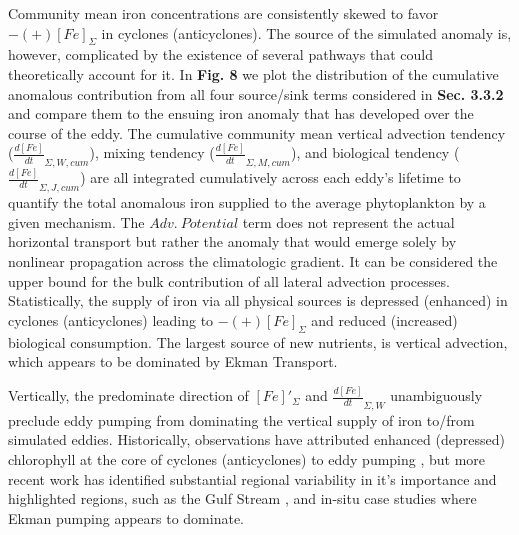 Community mean iron concentrations are consistently skewed to favor $-(+)[Fe]_\Sigma$ in cyclones (anticyclones). The source of the simulated  anomaly is, however, complicated by the existence of several pathways that could theoretically account for it. In \textbf{Fig. 8} we plot the distribution of the cumulative anomalous contribution from all four source/sink terms considered in \textbf{Sec. 3.3.2} and compare them to the ensuing iron anomaly that has developed over the course of the eddy.  The cumulative community mean vertical advection tendency ($\frac{d[Fe]}{dt}_{\Sigma, W, cum}$), mixing tendency ($\frac{d[Fe]}{dt}_{\Sigma, M, cum}$), and biological tendency ($\frac{d[Fe]}{dt}_{\Sigma, J, cum}$) are all integrated cumulatively across each eddy's lifetime to quantify the total anomalous iron supplied to the average phytoplankton by a given mechanism. The $Adv. 
\ Potential$ term does not represent the actual horizontal transport but rather the anomaly that would emerge solely by nonlinear propagation across the climatologic gradient. It can be considered the upper bound for the bulk contribution of all lateral advection processes. Statistically, the supply of iron via all physical sources is depressed (enhanced) in cyclones (anticyclones) leading to  $-(+)[Fe]_\Sigma$ and reduced (increased) biological consumption. The largest source of new nutrients, is vertical advection, which appears to be dominated by Ekman Transport. 

Vertically, the predominate direction of $[Fe]'_\Sigma$ and $\frac{d[Fe]}{dt}_{\Sigma, W}$ unambiguously preclude eddy pumping from dominating the vertical supply of iron to/from simulated eddies. Historically, observations have attributed enhanced (depressed) chlorophyll at the core of cyclones (anticyclones) to eddy pumping \parencite{FalkowskiRoleeddypumping1991,SiegelMesoscaleeddiessatellite1999, McGillicuddyInfluencemesoscaleeddies1998}, but more recent work has identified substantial regional variability in it's importance \parencite{GaubeRegionalvariationsinfluence2014, GaubeSatelliteObservationsMesoscale2014} and highlighted regions, such as the Gulf Stream \parencite{GaubeinfluenceGulfStream2017, ZhangImpactsMesoscaleEddies2018}, and in-situ case studies \textcite{McGillicuddyEddywindinteractions2007} where Ekman pumping appears to dominate. 
    
